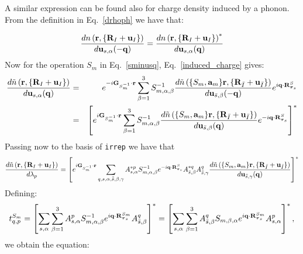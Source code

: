 \documentclass[12pt,a4paper,twoside]{report}
\begin{document}
A similar expression can be found also for charge density induced by a phonon. From the definition in Eq.~\ref{drhoph} we have that:

\begin{equation}
{d n\left({\bf r}, \{{\bf R}_I + {\bf u}_I\}\right)
\over d {\bf u}_{s,\alpha}(-{\bf q})} =
{d n\left({\bf r}, \{{\bf R}_I + {\bf u}_I\}\right)^*
\over d {\bf u}_{s,\alpha}({\bf q})}
\label{drhoph_def}
\end{equation}
Now for the operation $S_m$ in Eq.~\ref{sminusq}, Eq.~\ref{induced_charge} gives:
\begin{eqnarray}
{d \tilde n\left({\bf r}, \{{\bf R}_I + {\bf u}_I\}\right)
\over d {\bf u}_{s,\alpha}({\bf q})} &=& e^{-i{\bf G}_{S^{-1}_m} \cdot {\bf r }} \sum_{\beta=1}^3 S^{-1}_{m,\alpha,\beta} 
{d \tilde n\left(\{S_m,{\bf a}_m\} {\bf r}, \{{\bf R}_{\bar I} + {\bf u}_{\bar I}\}\right)
\over d {\bf u}_{\bar s,\beta} (-{\bf q})} e^{i{\bf q}\cdot {\bf R}^S_{{\boldsymbol{\tau}_s}}} \nonumber \\
&=& \left[
e^{i{\bf G}_{S^{-1}_m} \cdot {\bf r }} \sum_{\beta=1}^3 S^{-1}_{m,\alpha,\beta} 
{d \tilde n\left(\{S_m,{\bf a}_m\} {\bf r}, \{{\bf R}_{\bar I} + {\bf u}_{\bar I}\}\right)
\over d {\bf u}_{\bar s,\beta} ({\bf q})} e^{-i{\bf q}\cdot {\bf R}^S_{{\boldsymbol{\tau}_s}}}\right]^*
\nonumber \\
\label{induced_charge_minusq}
\end{eqnarray}
Passing now to the basis of \texttt{irrep} we have that
\begin{equation}
{d \tilde n\left({\bf r}, \{{\bf R}_I + {\bf u}_I\}\right)
\over d \lambda_p} =
\left[
e^{i{\bf G}_{S^{-1}_m} \cdot {\bf r }} \sum_{q,s,\alpha,\bar{\bar s},\beta,\gamma} A^{*p}_{s,\alpha}S^{-1}_{m,\alpha,\beta} e^{-i{\bf q}\cdot {\bf R}^S_{{\boldsymbol{\tau}_s}}} A^{*q}_{\bar s,\beta} A^{q}_{\bar {\bar s},\gamma}
{d \tilde n\left(\{S_m,{\bf a}_m\} {\bf r}, \{{\bf R}_{\bar I} + {\bf u}_{\bar I}\}\right)
\over d {\bf u}_{\bar {\bar s},\gamma} ({\bf q})} \right]^*
\end{equation}
Defining:
\begin{equation}
t_{q,p}^{S_m}= \left[
\sum_{s,\alpha}
\sum_{\beta=1}^3 A^p_{s,\alpha} S^{-1}_{m,\alpha,\beta} e^{i{\bf q}\cdot {\bf R}^{S_m}_{{\boldsymbol{\tau}_s}}} A^{q}_{\bar s,\beta}\right]^* = \left[\sum_{s,\alpha}
\sum_{\beta=1}^3 A^{q}_{\bar s,\beta} S_{m,\beta,\alpha} e^{i{\bf q}\cdot {\bf R}^{S_m}_{{\boldsymbol{\tau}_s}}} A^p_{s,\alpha}\right]^*,
\label{tmq}
\end{equation}
we obtain the equation:
\end{document}
